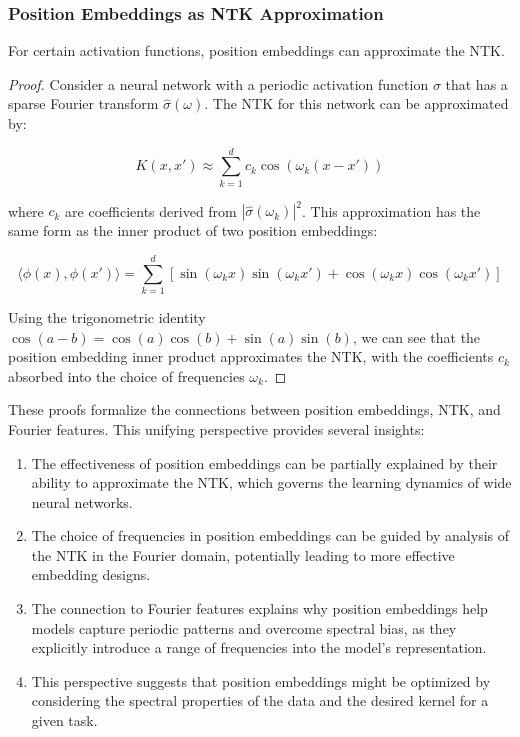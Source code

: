 \documentclass{article}
\begin{document}
\subsubsection{Position Embeddings as NTK Approximation}

\begin{theorem}
For certain activation functions, position embeddings can approximate the NTK.
\end{theorem}

\begin{proof}
Consider a neural network with a periodic activation function $\sigma$ that has a sparse Fourier transform $\hat{\sigma}(\omega)$. The NTK for this network can be approximated by:

\begin{equation}
    K(x, x') \approx \sum_{k=1}^d c_k \cos(\omega_k(x-x'))
\end{equation}

where $c_k$ are coefficients derived from $|\hat{\sigma}(\omega_k)|^2$. This approximation has the same form as the inner product of two position embeddings:

\begin{equation}
    \langle \phi(x), \phi(x') \rangle = \sum_{k=1}^d [\sin(\omega_k x)\sin(\omega_k x') + \cos(\omega_k x)\cos(\omega_k x')]
\end{equation}

Using the trigonometric identity $\cos(a-b) = \cos(a)\cos(b) + \sin(a)\sin(b)$, we can see that the position embedding inner product approximates the NTK, with the coefficients $c_k$ absorbed into the choice of frequencies $\omega_k$.
\end{proof}

These proofs formalize the connections between position embeddings, NTK, and Fourier features. This unifying perspective provides several insights:

\begin{enumerate}
    \item The effectiveness of position embeddings can be partially explained by their ability to approximate the NTK, which governs the learning dynamics of wide neural networks.
    \item The choice of frequencies in position embeddings can be guided by analysis of the NTK in the Fourier domain, potentially leading to more effective embedding designs.
    \item The connection to Fourier features explains why position embeddings help models capture periodic patterns and overcome spectral bias, as they explicitly introduce a range of frequencies into the model's representation.
    \item This perspective suggests that position embeddings might be optimized by considering the spectral properties of the data and the desired kernel for a given task.
\end{enumerate}
\end{document}
